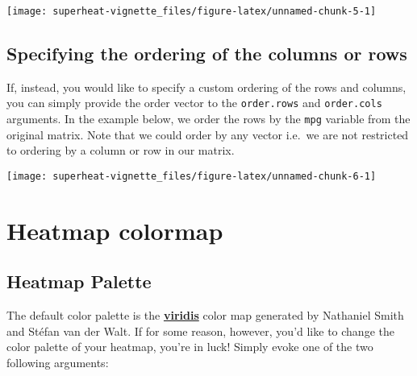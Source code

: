 \documentclass[]{book}
\newenvironment{Shaded}{\begin{snugshade}}{\end{snugshade}}
\newcommand{\KeywordTok}[1]{\textcolor[rgb]{0.13,0.29,0.53}{\textbf{{#1}}}}
\newcommand{\DataTypeTok}[1]{\textcolor[rgb]{0.13,0.29,0.53}{{#1}}}
\newcommand{\FloatTok}[1]{\textcolor[rgb]{0.00,0.00,0.81}{{#1}}}
\newcommand{\CommentTok}[1]{\textcolor[rgb]{0.56,0.35,0.01}{\textit{{#1}}}}
\newcommand{\OtherTok}[1]{\textcolor[rgb]{0.56,0.35,0.01}{{#1}}}
\newcommand{\NormalTok}[1]{{#1}}
\theoremstyle{definition}
\theoremstyle{definition}
\theoremstyle{remark}
\begin{document}
\begin{center}\texttt{[image: superheat-vignette\_files/figure-latex/unnamed-chunk-5-1]} \end{center}

\section{Specifying the ordering of the columns or
rows}\label{specifying-the-ordering-of-the-columns-or-rows}

If, instead, you would like to specify a custom ordering of the rows and
columns, you can simply provide the order vector to the
\texttt{order.rows} and \texttt{order.cols} arguments. In the example
below, we order the rows by the \texttt{mpg} variable from the original
matrix. Note that we could order by any vector i.e.~we are not
restricted to ordering by a column or row in our matrix.

\begin{Shaded}
\end{Shaded}

\begin{center}\texttt{[image: superheat-vignette\_files/figure-latex/unnamed-chunk-6-1]} \end{center}

\chapter{Heatmap colormap}\label{heatmap-colormap}

\section{Heatmap Palette}\label{heatmap-palette}

The default color palette is the
\href{http://bids.github.io/colormap/}{\textbf{viridis}} color map
generated by Nathaniel Smith and Stéfan van der Walt. If for some
reason, however, you'd like to change the color palette of your heatmap,
you're in luck! Simply evoke one of the two following arguments:
\end{document}
